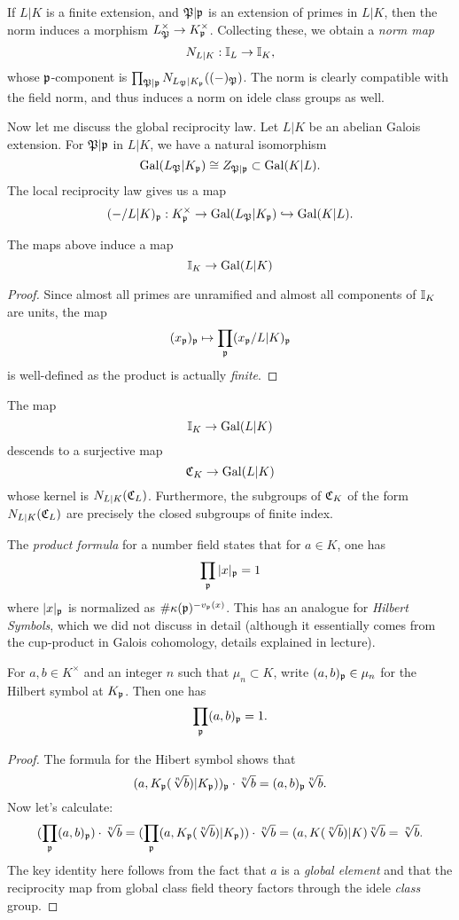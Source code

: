 If $L|K$ is a finite extension, and $\mathfrak{P}|\mathfrak{p}$ is an extension of primes in $L|K$, then the norm induces a morphism $L_{\mathfrak{P}}^{\times} \to K_{\mathfrak{p}}^{\times}$.
Collecting these, we obtain a \emph{norm map}
\[ N_{L|K} : \mathbb{I}_{L} \to \mathbb{I}_{K}, \]
whose $\mathfrak{p}$-component is $\prod_{\mathfrak{P}|\mathfrak{p}}N_{L_{\mathfrak{P}}|K_{\mathfrak{p}}}((-)_{\mathfrak{P}})$.
The norm is clearly compatible with the field norm, and thus induces a norm on idele class groups as well.

Now let me discuss the global reciprocity law.
Let $L|K$ be an abelian Galois extension.
For $\mathfrak{P}|\mathfrak{p}$ in $L|K$, we have a natural isomorphism
\[ \operatorname{Gal}(L_{\mathfrak{P}}|K_{\mathfrak{p}}) \cong Z_{\mathfrak{P}|\mathfrak{p}} \subset \operatorname{Gal}(K|L). \]
The local reciprocity law gives us a map
\[ (-/L|K)_{\mathfrak{p}} : K_{\mathfrak{p}}^{\times} \to \operatorname{Gal}(L_{\mathfrak{P}}|K_{\mathfrak{p}}) \hookrightarrow \operatorname{Gal}(K|L). \]
\begin{lemma}
  The maps above induce a map
  \[ \mathbb{I}_{K} \to \operatorname{Gal}(L|K) \]
\end{lemma}
\begin{proof}
  Since almost all primes are unramified and almost all components of $\mathbb{I}_{K}$ are units, the map
  \[ (x_{\mathfrak{p}})_{\mathfrak{p}} \mapsto \prod_{\mathfrak{p}}(x_{\mathfrak{p}}/L|K)_{\mathfrak{p}} \]
  is well-defined as the product is actually \emph{finite}.
\end{proof}

\begin{theorem}
  The map
  \[ \mathbb{I}_{K} \to \operatorname{Gal}(L|K) \]
  descends to a surjective map
  \[ \mathfrak{C}_{K} \to \operatorname{Gal}(L|K) \]
  whose kernel is $N_{L|K}(\mathfrak{C}_{L})$.
  Furthermore, the subgroups of $\mathfrak{C}_{K}$ of the form $N_{L|K}(\mathfrak{C}_{L})$ are precisely the closed subgroups of finite index.
\end{theorem}

The \emph{product formula} for a number field states that for $a \in K$, one has
\[ \prod_{\mathfrak{p}}|x|_{\mathfrak{p}} = 1 \]
where $|x|_{\mathfrak{p}}$ is normalized as $\#\kappa(\mathfrak{p})^{-v_{\mathfrak{p}}(x)}$.
This has an analogue for \emph{Hilbert Symbols}, which we did not discuss in detail (although it essentially comes from the cup-product in Galois cohomology, details explained in lecture).
\begin{theorem}
  For $a,b \in K^{\times}$ and an integer $n$ such that $\mu_{n} \subset K$, write $(a,b)_{\mathfrak{p}} \in \mu_{n}$ for the Hilbert symbol at $K_{\mathfrak{p}}$.
  Then one has
  \[ \prod_{\mathfrak{p}}(a,b)_{\mathfrak{p}} = 1. \]
\end{theorem}
\begin{proof}
  The formula for the Hibert symbol shows that
  \[ (a,K_{\mathfrak{p}}(\sqrt[n]{b})|K_{\mathfrak{p}}))_{\mathfrak{p}} \cdot \sqrt[n]{b} = (a,b)_{\mathfrak{p}} \sqrt[n]{b}. \]
  Now let's calculate:
  \[ (\prod_{\mathfrak{p}}(a,b)_{\mathfrak{p}}) \cdot \sqrt[n]{b} = (\prod_{\mathfrak{p}}(a,K_{\mathfrak{p}}(\sqrt[n]{b})|K_{\mathfrak{p}})) \cdot \sqrt[n]{b} = (a,K(\sqrt[n]{b})|K)\sqrt[n]{b} = \sqrt[n]{b}. \]
  The key identity here follows from the fact that $a$ is a \emph{global element} and that the reciprocity map from global class field theory factors through the idele \emph{class} group.
\end{proof}

